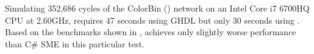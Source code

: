 Simulating 352,686 cycles of the ColorBin () network on an
Intel Core i7 6700HQ CPU at 2.60GHz, requires 47 seconds using GHDL but only 30
seconds using \libsme. Based on the benchmarks shown in \cite{skovhede2017c++},
\libsme{} achieves only slightly worse performance than C\# SME in this
particular test.


